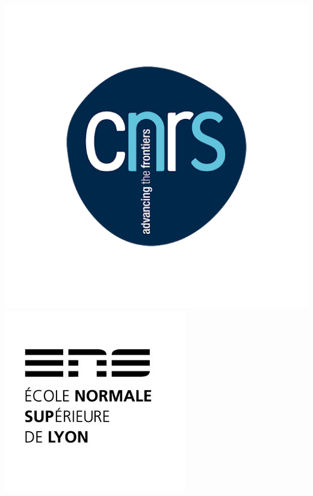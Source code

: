 \documentclass[9pt, dvipsnames,aspectratio=169]{beamer} %
\begin{document}
\begin{frame}
\begin{columns}
    \includegraphics[width=\linewidth]{cnrs.png} \vspace{0.5cm}
    \includegraphics[width=\linewidth]{logo_ENS.jpg}

\end{columns}
\end{frame}
\end{document}
